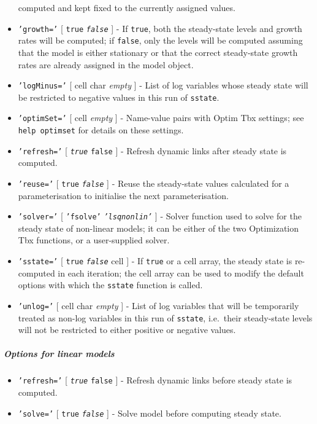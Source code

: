 \begin{itemize}
  computed and kept fixed to the currently assigned values.
\item
  \texttt{'growth='} {[} \texttt{true} \textbar{} \emph{\texttt{false}}
  {]} - If \texttt{true}, both the steady-state levels and growth rates
  will be computed; if \texttt{false}, only the levels will be computed
  assuming that the model is either stationary or that the correct
  steady-state growth rates are already assigned in the model object.
\item
  \texttt{'logMinus='} {[} cell \textbar{} char \textbar{} \emph{empty}
  {]} - List of log variables whose steady state will be restricted to
  negative values in this run of \texttt{sstate}.
\item
  \texttt{'optimSet='} {[} cell \textbar{} \emph{empty} {]} - Name-value
  pairs with Optim Tbx settings; see \texttt{help optimset} for details
  on these settings.
\item
  \texttt{'refresh='} {[} \emph{\texttt{true}} \textbar{} \texttt{false}
  {]} - Refresh dynamic links after steady state is computed.
\item
  \texttt{'reuse='} {[} \texttt{true} \textbar{} \emph{\texttt{false}}
  {]} - Reuse the steady-state values calculated for a parameterisation
  to initialise the next parameterisation.
\item
  \texttt{'solver='} {[} \texttt{'fsolve'} \textbar{}
  \emph{\texttt{'lsqnonlin'}} {]} - Solver function used to solve for
  the steady state of non-linear models; it can be either of the two
  Optimization Tbx functions, or a user-supplied solver.
\item
  \texttt{'sstate='} {[} \texttt{true} \textbar{} \emph{\texttt{false}}
  \textbar{} cell {]} - If \texttt{true} or a cell array, the steady
  state is re-computed in each iteration; the cell array can be used to
  modify the default options with which the \texttt{sstate} function is
  called.
\item
  \texttt{'unlog='} {[} cell \textbar{} char \textbar{} \emph{empty} {]}
  - List of log variables that will be temporarily treated as non-log
  variables in this run of \texttt{sstate}, i.e.~their steady-state
  levels will not be restricted to either positive or negative values.
\end{itemize}

\subparagraph{Options for linear
models}

\begin{itemize}
\item
  \texttt{'refresh='} {[} \emph{\texttt{true}} \textbar{} \texttt{false}
  {]} - Refresh dynamic links before steady state is computed.
\item
  \texttt{'solve='} {[} \texttt{true} \textbar{} \emph{\texttt{false}}
  {]} - Solve model before computing steady state.
\end{itemize}

